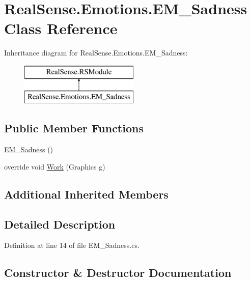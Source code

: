 \hypertarget{class_real_sense_1_1_emotions_1_1_e_m___sadness}{}\section{Real\+Sense.\+Emotions.\+E\+M\+\_\+\+Sadness Class Reference}
\label{class_real_sense_1_1_emotions_1_1_e_m___sadness}
Inheritance diagram for Real\+Sense.\+Emotions.\+E\+M\+\_\+\+Sadness\+:\begin{figure}[H]
\begin{center}
\leavevmode
\includegraphics[height=2.000000cm]{class_real_sense_1_1_emotions_1_1_e_m___sadness}
\end{center}
\end{figure}
\subsection*{Public Member Functions}
\begin{DoxyCompactItemize}
\item 
\hyperlink{class_real_sense_1_1_emotions_1_1_e_m___sadness_ad0a149a2f1b6aefd5fedd870a1cefb00}{E\+M\+\_\+\+Sadness} ()
\item 
override void \hyperlink{class_real_sense_1_1_emotions_1_1_e_m___sadness_a45cf23f5c3382bc9769abf1ef401ade1}{Work} (Graphics g)
\end{DoxyCompactItemize}
\subsection*{Additional Inherited Members}


\subsection{Detailed Description}


Definition at line 14 of file E\+M\+\_\+\+Sadness.\+cs.



\subsection{Constructor \& Destructor Documentation}
\mbox{\label{class_real_sense_1_1_emotions_1_1_e_m___sadness_ad0a149a2f1b6aefd5fedd870a1cefb00}} 
